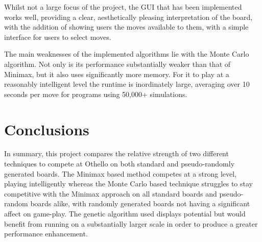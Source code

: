 \documentclass[12pt,a4paper]{article}
\begin{document}
Whilst not a large focus of the project, the GUI that has been implemented works well, providing a clear, aesthetically pleasing interpretation of the board, with the addition of showing users the moves available to them, with a simple interface for users to select moves.

The main weaknesses of the implemented algorithms lie with the Monte Carlo algorithm. Not only is its performance substantially weaker than that of Minimax, but it also uses significantly more memory. For it to play at a reasonably intelligent level the runtime is inordinately large, averaging over 10 seconds per move for programs using 50,000+ simulations. 



\section{Conclusions}

In summary, this project compares the relative strength of two different techniques to compete at Othello on both standard and pseudo-randomly generated boards. The Minimax based method competes at a strong level, playing intelligently whereas the Monte Carlo based technique struggles to stay competitive with the Minimax approach on all standard boards and pseudo-random boards alike, with randomly generated boards not having a significant affect on game-play. The genetic algorithm used displays potential but would benefit from running on a substantially larger scale in order to produce a greater performance enhancement.
\end{document}

